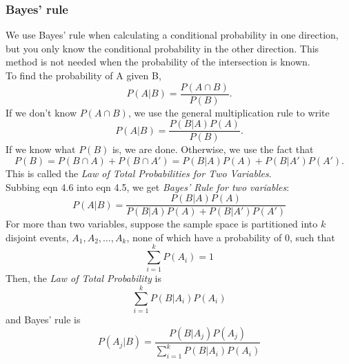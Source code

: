 \documentclass{report}
\begin{document}
            \subsubsection{Bayes' rule}  %
                We use Bayes' rule when calculating a conditional probability in one direction, but you only know the conditional probability in the other direction. This method is not needed when the probability of the intersection is known. \\
                To find the probability of A given B,
                \begin{equation}
                    P(A\vert B)=\frac{P(A\cap B)}{P(B)}.
                \end{equation}
                If we don't know $P(A\cap B)$, we use the general multiplication rule to write
                \begin{equation}
                    P(A\vert B)=\frac{P(B\vert A)P(A)}{P(B)}.
                \end{equation}
                If we know what $P(B)$ is, we are done. Otherwise, we use the fact that
                \begin{equation}
                    P(B)=P(B\cap A)+P(B\cap A')=P(B\vert A)P(A) + P(B\vert A')P(A').
                \end{equation}
                This is called the \emph{Law of Total Probabilities for Two Variables}. \\
                Subbing eqn 4.6 into eqn 4.5, we get \emph{Bayes' Rule for two variables}:
                \begin{equation}
                    P(A\vert B)=\frac{P(B\vert A)P(A)}{P(B\vert A)P(A)+P(B\vert A')P(A')}
                \end{equation}
                For more than two variables, suppose the sample space is partitioned into $k$ disjoint events, $A_1, A_2, \ldots, A_k$, none of which have a probability of 0, such that
                \begin{equation} \sum^k_{i=1}P(A_i)=1 \end{equation}
                Then, the \emph{Law of Total Probability} is
                \begin{equation} \sum^k_{i=1}P(B\vert A_i)P(A_i) \end{equation}
                and Bayes' rule is
                \begin{equation} P(A_j\vert B)=\frac{P(B\vert A_j)P(A_j)}{\sum^k_{i=1}P(B\vert A_i)P(A_i)} \end{equation}
\end{document}
